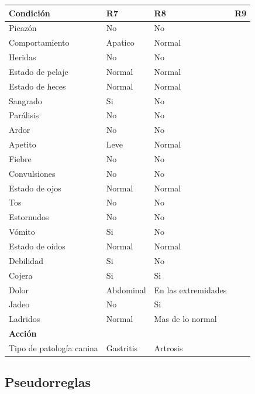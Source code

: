 \documentclass[a4paper,table,xcdraw]{article}
\begin{document}
\begin{table}[H]
\centering
\begin{tabular}{|l|l|l|l|}
\hline
\textbf{Condición}       & R7 & R8 & R9 \\ \hline
Picazón & No & No   &    \\ \hline
Comportamiento & Apatico & Normal   &    \\ \hline
Heridas & No & No   &    \\ \hline
Estado de pelaje & Normal  & Normal    &    \\ \hline
Estado de heces & Normal  & Normal   &    \\ \hline
Sangrado & Si & No   &    \\ \hline
Parálisis & No & No    &    \\ \hline
Ardor & No & No    &    \\ \hline
Apetito & Leve & Normal    &    \\ \hline
Fiebre & No & No   &    \\ \hline
Convulsiones & No & No   &    \\ \hline
Estado de ojos & Normal & Normal   &    \\ \hline
Tos & No & No   &    \\ \hline
Estornudos & No & No   &    \\ \hline
Vómito & Si & No   &    \\ \hline
Estado de oídos & Normal & Normal   &    \\ \hline
Debilidad & Si  & No   &    \\ \hline
Cojera & Si & Si   &    \\ \hline
Dolor & Abdominal & En las extremidades   &    \\ \hline
Jadeo & No & Si    &    \\ \hline
Ladridos & Normal  & Mas de lo normal   &    \\ \hline
\textbf{Acción}          &    &    &    \\ \hline
Tipo de patología canina & Gastritis & Artrosis &  \\ \hline
\end{tabular}
\end{table}

\subsection{Pseudorreglas}
\end{document}
